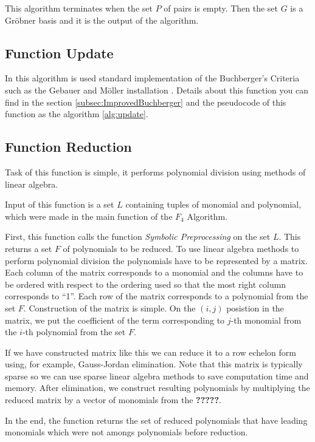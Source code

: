 This algorithm terminates when the set $P$ of pairs is empty. Then the set $G$ is a Gr\"obner basis and it is the output of the algorithm.



\subsection{Function Update}
In this algorithm is used standard implementation of the Buchberger's Criteria such as the Gebauer and M\"oller installation \cite{Gebauer-Moller88}. Details about this function you can find in the section \ref{subsec:ImprovedBuchberger} and the pseudocode of this function as the algorithm \ref{alg:update}.

\subsection{Function Reduction}
Task of this function is simple, it performs polynomial division using methods of linear algebra.

Input of this function is a set $L$ containing tuples of monomial and polynomial, which were made in the main function of the $F_4$ Algorithm.

First, this function calls the function \textit{Symbolic Preprocessing} on the set $L$. This returns a set $F$ of polynomials to be reduced. To use linear algebra methods to perform polynomial division the polynomials have to be represented by a matrix. Each column of the matrix corresponds to a monomial and the columns have to be ordered with respect to the ordering used so that the most right column corresponds to ``1''. Each row of the matrix corresponds to a polynomial from the set $F$. Construction of the matrix is simple. On the $(i, j)$ posistion in the matrix, we put the coefficient of the term corresponding to $j$-th monomial from the $i$-th polynomial from the set $F$.

If we have constructed matrix like this we can reduce it to a row echelon form using, for example, Gauss-Jordan elimination. Note that this matrix is typically sparse so we can use sparse linear algebra methods to save computation time and memory. After elimination, we construct resulting polynomials by multiplying the reduced matrix by a vector of monomials from the \textbf{?????}.

In the end, the function returns the set of reduced polynomials that have leading monomials which were not amongs polynomials before reduction.

